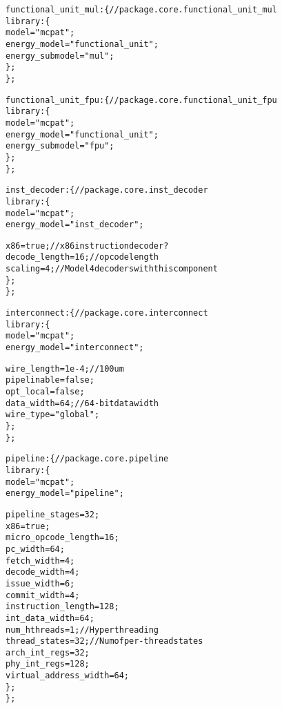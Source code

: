 {\begin{alltt}
                    functional\_unit\_mul: \{ // package.core.functional\_unit\_mul
                        library: \{
                            model = "mcpat";
                            energy_model = "functional_unit";
                            energy_submodel = "mul";
                        \};
                    \};
                    
                    functional\_unit\_fpu: \{ // package.core.functional\_unit\_fpu
                        library: \{
                            model = "mcpat";
                            energy_model = "functional_unit";
                            energy_submodel = "fpu";
                        \};
                    \};
                    
                    inst\_decoder: \{ // package.core.inst\_decoder
                        library: \{
                            model = "mcpat";
                            energy_model = "inst_decoder";
                            
                            x86 = true; // x86 instruction decoder?
                            decode_length = 16; // opcode length
                            scaling = 4; // Model 4 decoders with this component
                        \};
                    \};
                    
                    interconnect: \{ // package.core.interconnect
                        library: \{
                            model = "mcpat";
                            energy_model = "interconnect";
                            
                            wire_length = 1e-4; // 100um
                            pipelinable = false;
                            opt_local = false;
                            data_width = 64; // 64-bit data width
                            wire_type = "global";
                        \};
                    \};
                    
                    pipeline: \{ // package.core.pipeline
                        library: \{
                            model = "mcpat";
                            energy_model = "pipeline";
                            
                            pipeline_stages = 32;
                            x86 = true;
                            micro_opcode_length = 16;
                            pc_width = 64;
                            fetch_width = 4;
                            decode_width = 4;
                            issue_width = 6;
                            commit_width = 4;
                            instruction_length = 128;
                            int_data_width = 64;
                            num_hthreads = 1; // Hyperthreading
                            thread_states = 32; // Num of per-thread states
                            arch_int_regs = 32;
                            phy_int_regs = 128;
                            virtual_address_width = 64;
                        \};
                    \};
                    

\end{alltt}}

